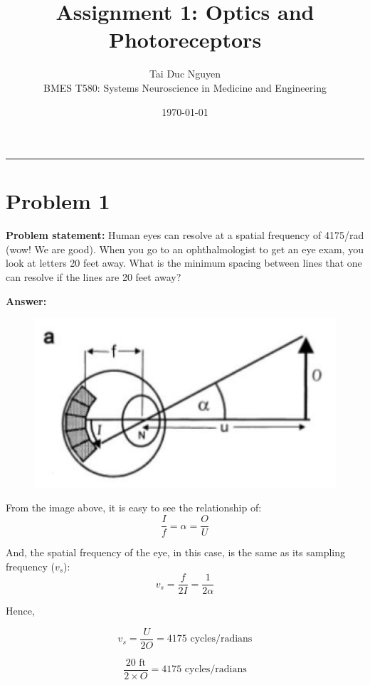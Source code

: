 \documentclass[letterpaper, 11pt]{article}
\title{Assignment 1: Optics and Photoreceptors}
\author{
Tai Duc Nguyen \\
BMES T580: Systems Neuroscience in Medicine and Engineering
}
\date{\today}
\begin{document}
\maketitle

\rule{\textwidth}{1pt}

\section{Problem 1}
\label{sec:prob1}
\textbf{Problem statement:} Human eyes can resolve at a spatial frequency of 4175/rad (wow! We are good). When you go to an ophthalmologist to get an eye exam, you look at letters 20 feet away. What is the minimum spacing between lines that one can resolve if the lines are 20 feet away?

\textbf{Answer:}

\begin{figure}[htb!]
	\centering
	\includegraphics[width=0.6\linewidth]{1_fig.png}
	\label{fig1}
\end{figure}

From the image above, it is easy to see the relationship of:
\begin{equation}
	\frac{I}{f} = \alpha = \frac{O}{U}
\end{equation}

And, the spatial frequency of the eye, in this case, is the same as its sampling frequency ($v_s$):
\begin{equation}
	v_s = \frac{f}{2I} = \frac{1}{2\alpha}
\end{equation}

Hence,

\begin{equation}
	v_s = \frac{U}{2O} = 4175 \text{ cycles/radians}
\end{equation}

\begin{equation}
	\frac{20 \text{ ft}}{2\times O} = 4175 \text{ cycles/radians}
\end{equation}
\end{document}
